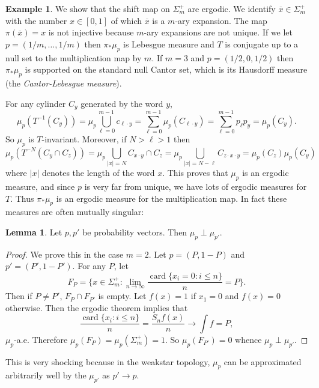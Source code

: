 \documentclass[12pt]{report}
\newcommand{\card}{\operatorname{card}}
\newcommand{\dfn}[1]{\emph{#1}\index{#1}}
\theoremstyle{definition}
\newtheorem{lemma}[theorem]{Lemma}
\newtheorem{example}[theorem]{Example}
\begin{document}
\begin{example}
We show that the shift map on $\Sigma_m^+$ are ergodic. We identify $\overline x \in \Sigma_m^+$ with the number $x \in [0, 1]$ of which $\overline x$ is a $m$-ary expansion. The map $\pi(\overline x) = x$ is not injective because $m$-ary expansions are not unique. If we let $p = (1/m, \dots, 1/m)$ then $\pi_*\mu_p$ is Lebesgue measure and $T$ is conjugate up to a null set to the multiplication map by $m$. If $m = 3$ and $p = (1/2, 0, 1/2)$ then $\pi_*\mu_p$ is supported on the standard null Cantor set, which is its Hausdorff measure (the \dfn{Cantor-Lebesgue measure}).

For any cylinder $C_y$ generated by the word $y$,
$$\mu_p(T^{-1}(C_y)) = \mu_p \bigcup_{\ell=0}^{m-1} c_{\ell \cdot y} = \sum_{\ell=0}^{m-1} \mu_p(C_{\ell \cdot y}) = \sum_{\ell=0}^{m-1} p_\ell p_y = \mu_p(C_y).$$
So $\mu_p$ is $T$-invariant. Moreover, if $N > \ell > 1$ then
$$\mu_p(T^{-N}(C_y \cap C_z)) = \mu_p \bigcup_{|x| = N} C_{x \cdot y} \cap C_z = \mu_p \bigcup_{|x| = N - \ell} C_{z\cdot x \cdot y} = \mu_p(C_z) \mu_p(C_y)$$
where $|x|$ denotes the length of the word $x$. This proves that $\mu_p$ is an ergodic measure, and since $p$ is very far from unique, we have lots of ergodic measures for $T$. Thus $\pi_*\mu_p$ is an ergodic measure for the multiplication map. In fact these measures are often mutually singular:
\begin{lemma}
Let $p, p'$ be probability vectors. Then $\mu_p \perp \mu_{p'}$.
\end{lemma}
\begin{proof}
We prove this in the case $m = 2$. Let $p = (P, 1 - P)$ and $p' = (P', 1 - P')$. For any $P$, let
$$F_P = \{x \in \Sigma_m^+: \lim_{n \to \infty }\frac{\card \{x_i = 0: i \leq n\}}{n} = P\}.$$
Then if $P \neq P'$, $F_P \cap F_{P'}$ is empty. Let $f(x) = 1$ if $x_1 = 0$ and $f(x) = 0$ otherwise. Then the ergodic theorem implies that
$$\frac{\card \{x_i: i \leq n\}}{n} = \frac{S_nf(x)}{n} \to \int f = P,$$
$\mu_p$-a.e. Therefore $\mu_p(F_P) = \mu_p(\Sigma_m^+) = 1$. So $\mu_p(F_{P'}) = 0$ whence $\mu_p \perp \mu_{p'}$.
\end{proof}
This is very shocking because in the weakstar topology, $\mu_p$ can be approximated arbitrarily well by the $\mu_{p'}$ as $p' \to p$.
\end{example}
\end{document}
